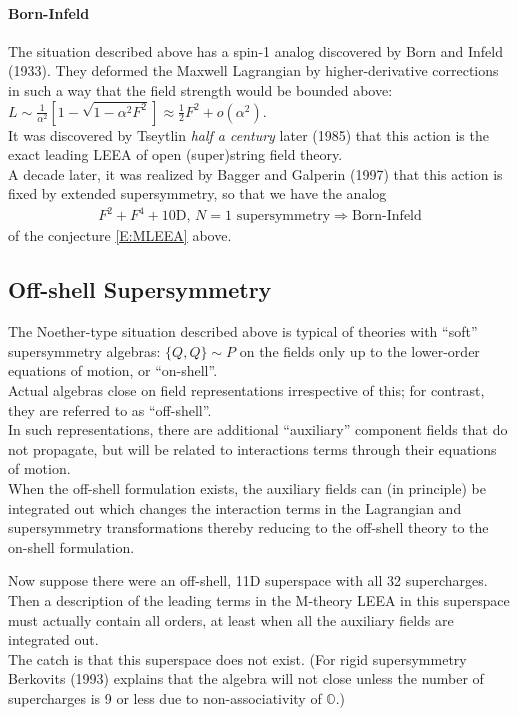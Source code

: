 \documentclass[a4paper,12pt]{article} %
\begin{document}
\paragraph{Born-Infeld}

The situation described above has a spin-1 analog discovered by Born and Infeld (1933). 
They deformed the Maxwell Lagrangian by higher-derivative corrections in such a way that the field strength would be bounded above: $L\sim \frac1{\alpha^2 }[1-\sqrt{1-\alpha^2 F^2}]\approx \tfrac12 F^2 + o(\alpha^2 )$.\\
It was discovered by Tseytlin {\em half a century} later (1985) that this action is the exact leading LEEA of open (super)string field theory. \\
A decade later, it was realized by Bagger and Galperin (1997) that this action is fixed by extended supersymmetry, so that we have the analog 
\begin{align}
F^2 + F^4 + \textrm{10D, $N=1$ supersymmetry} \Rightarrow \textrm{Born-Infeld}
\nonumber
\end{align}
of the conjecture \eqref{E:MLEEA} above. 



\subsection{Off-shell Supersymmetry}
The Noether-type situation described above is typical of theories with ``soft'' supersymmetry algebras: $\{ Q, Q\}\sim P$ on the fields only up to the lower-order equations of motion, or ``on-shell''.\\
Actual algebras close on field representations irrespective of this; for contrast, they are referred to as ``off-shell''. \\
In such representations, there are additional ``auxiliary'' component fields that do not propagate, but will be related to interactions terms through their equations of motion. \\
When the off-shell formulation exists, the auxiliary fields can (in principle) be integrated out which changes the interaction terms in the Lagrangian and supersymmetry transformations thereby reducing to the off-shell theory to the on-shell formulation. 

Now suppose there were an off-shell, 11D superspace with all 32 supercharges. \\
Then a description of the leading terms in the M-theory LEEA in this superspace must actually contain all orders, at least when all the auxiliary fields are integrated out. \\
The catch is that this superspace does not exist. (For rigid supersymmetry Berkovits (1993) explains that the algebra will not close unless the number of supercharges is 9 or less due to non-associativity of $\mathbb O$.)
\end{document}
